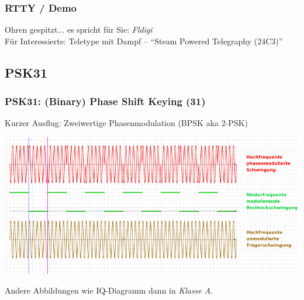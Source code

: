 \begin{frame}
    \frametitle{RTTY / Demo}

    \Large{Ohren gespitzt... es spricht für Sie: \emph{Fldigi}}\\[2em]
    \pause
    \bigskip
    \normalsize
    Für Interessierte:
    Teletype mit Dampf -- ``Steam Powered Telegraphy (24C3)''\hyperlink{refs}{\cite{steam}}

\end{frame}
 
\subsection{PSK31}

\begin{frame}
    \frametitle{PSK31: (\textbf{B}inary) \textbf{P}hase \textbf{S}hift \textbf{K}eying (31)}

    Kurzer Ausflug: Zweiwertige Phasenmodulation (BPSK aka 2-PSK)

    \begin{center}
        \includegraphics[width=.9\textwidth,height=.7\textheight,keepaspectratio]{e16/Phase_modulation_x800.png}
        \tiny \hyperlink{refs}{\cite{wc}}
    \end{center}

    Andere Abbildungen wie IQ-Diagramm dann in \emph{Klasse A}.

\end{frame}


